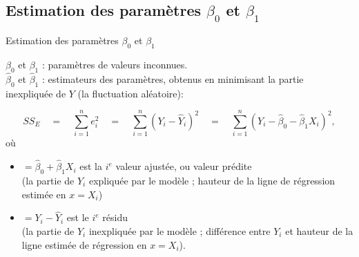 \documentclass{BeamerTemplate}
\begin{document}
\subsection[Estimer $\beta_0$, $\beta_1$]{Estimation des paramètres $\beta_0$ et $\beta_1$}

\begin{frame}[t]{Estimation des paramètres  $\beta_0$ et $\beta_1$}

{\small
$\beta_0$ et $\beta_1$ : paramètres de valeurs inconnues.\\[1mm]
$\hat{\beta}_0$ et $\hat{\beta}_1$ : estimateurs des paramètres, obtenus en \alert{minimisant la partie inexpliquée de $Y$} (la fluctuation aléatoire):

\medskip


$$
SS_E\quad=\quad\sum_{i=1}^ne_i^2\quad=\quad\sum_{i=1}^n(Y_i-\hat{Y}_i)^2\quad=\quad\sum_{i=1}^n(Y_i-\hat{\beta}_0-\hat{\beta}_1X_i)^2,
$$
où

\begin{itemize}
\item[$\hat{Y}_i$]$=\hat{\beta}_0+\hat{\beta}_1X_i$ est la $i^e$ \alert{valeur ajustée}, ou \alert{valeur prédite} \\(la partie de $Y_i$ expliquée par le modèle ; hauteur de la ligne de régression
estimée en $x=X_i$)
\item[$e_i$]$=Y_i-\hat{Y}_i$ est le $i^e$ \alert{ résidu} \\(la partie de $Y_i$ inexpliquée par le modèle ; différence entre $Y_i$ et hauteur de la ligne estimée de régression en $x=X_i$).
\end{itemize}
}
\end{frame}
\end{document}
